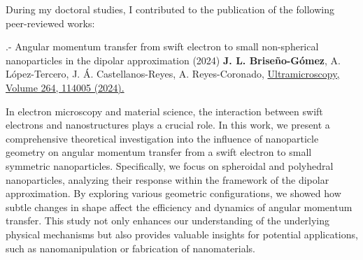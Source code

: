 \label{cap: list of publications}
\hypertarget{listofpublications}{During} my doctoral studies, I contributed to the publication of the following peer-reviewed works:
%
\vspace{0.5cm}

%
%
\begin{mybox2}{.- Angular momentum transfer from swift electron to small non-spherical nanoparticles in the dipolar approximation  (2024)}
	\textbf{J. L. Briseño-Gómez}, A. López-Tercero, J. Á. Castellanos-Reyes, A. Reyes-Coronado,
	\href{https://doi.org/10.1016/j.ultramic.2024.114005}{Ultramicroscopy,
		Volume 264,
		114005 
		(2024).}
\end{mybox2}{}
%
In electron microscopy and material science, the interaction between swift electrons and nanostructures plays a crucial role. In this work, we present a comprehensive theoretical investigation into the influence of nanoparticle geometry on angular momentum transfer from a swift electron to small symmetric nanoparticles. Specifically, we focus on spheroidal and polyhedral nanoparticles, analyzing their response within the framework of the dipolar approximation. By exploring various geometric configurations, we showed how subtle changes in shape affect the efficiency and dynamics of angular momentum transfer. This study not only enhances our understanding of the underlying physical mechanisms but also provides valuable insights for potential applications, such as nanomanipulation or fabrication of nanomaterials. 

\vspace{0.5cm}


%
%
%


